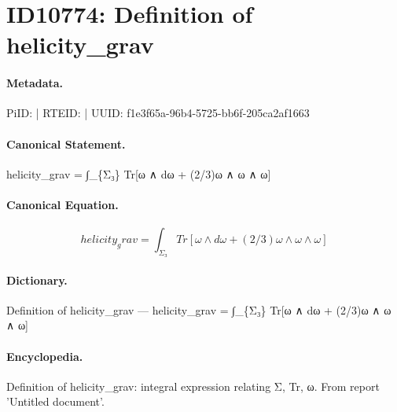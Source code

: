\section*{ID10774: Definition of helicity\_grav}
\paragraph{Metadata.}
PiID:  | RTEID:  | UUID: f1e3f65a-96b4-5725-bb6f-205ca2af1663

\paragraph{Canonical Statement.}
helicity\_grav = ∫\_\{Σ₃\} Tr[ω ∧ dω + (2/3)ω ∧ ω ∧ ω]

\paragraph{Canonical Equation.}
\[
helicity_grav = ∫_{Σ₃} Tr[ω ∧ dω + (2/3)ω ∧ ω ∧ ω]
\]

\paragraph{Dictionary.}
Definition of helicity\_grav — helicity\_grav = ∫\_\{Σ₃\} Tr[ω ∧ dω + (2/3)ω ∧ ω ∧ ω]

\paragraph{Encyclopedia.}
Definition of helicity\_grav: integral expression relating Σ, Tr, ω. From report 'Untitled document'.
